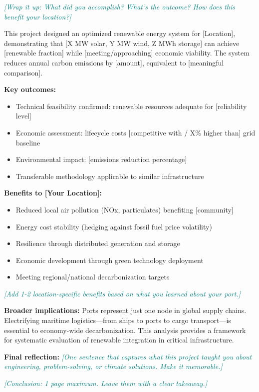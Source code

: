 \documentclass[11pt,letterpaper]{article}
\newcommand{\hint}[1]{\textcolor{teal}{\small\textit{[#1]}}}
\begin{document}
\hint{Wrap it up: What did you accomplish? What's the outcome? How does this benefit your location?}

This project designed an optimized renewable energy system for [Location], demonstrating that [X MW solar, Y MW wind, Z MWh storage] can achieve [renewable fraction] while [meeting/approaching] economic viability. The system reduces annual carbon emissions by [amount], equivalent to [meaningful comparison].

\textbf{Key outcomes:}
\begin{itemize}
    \item Technical feasibility confirmed: renewable resources adequate for [reliability level]
    \item Economic assessment: lifecycle costs [competitive with / X\% higher than] grid baseline
    \item Environmental impact: [emissions reduction percentage]
    \item Transferable methodology applicable to similar infrastructure
\end{itemize}

\textbf{Benefits to [Your Location]:}
\begin{itemize}
    \item Reduced local air pollution (NOx, particulates) benefiting [community]
    \item Energy cost stability (hedging against fossil fuel price volatility)
    \item Resilience through distributed generation and storage
    \item Economic development through green technology deployment
    \item Meeting regional/national decarbonization targets
\end{itemize}

\hint{Add 1-2 location-specific benefits based on what you learned about your port.}

\textbf{Broader implications:} Ports represent just one node in global supply chains. Electrifying maritime logistics—from ships to ports to cargo transport—is essential to economy-wide decarbonization. This analysis provides a framework for systematic evaluation of renewable integration in critical infrastructure.

\textbf{Final reflection:} \hint{One sentence that captures what this project taught you about engineering, problem-solving, or climate solutions. Make it memorable.}

\hint{Conclusion: 1 page maximum. Leave them with a clear takeaway.}
\end{document}

